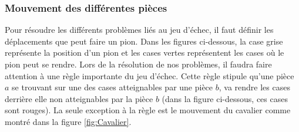 \documentclass[a4paper,11pt]{article}
\begin{document}
    	\subsubsection{Mouvement des différentes pièces}
        	Pour résoudre les différents problèmes liés au jeu d'échec, il faut définir les déplacements que peut faire un pion. Dans les figures ci-dessous, la case grise représente la position d'un pion et les cases vertes représentent les cases où le pion peut se rendre. Lors de la résolution de nos problèmes, il faudra faire attention à une règle importante du jeu d'échec. Cette règle stipule qu'une pièce $a$ se trouvant sur une des cases atteignables par une pièce $b$, va rendre les cases derrière elle non atteignables par la pièce $b$ (dans la figure ci-dessous, ces cases sont rouges). La seule exception à la règle est le mouvement du cavalier comme montré dans la figure \ref{fig:Cavalier}.
\end{document}
